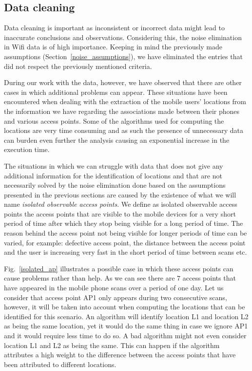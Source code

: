 \subsection{Data cleaning}
\label{data_cleaning}
Data cleaning is important as inconsistent or incorrect data might lead to
inaccurate conclusions and observations. Considering this, the noise elimination
in Wifi data is of high importance. Keeping in mind the previously made
assumptions (Section~\ref{noise_assumptions}), we have eliminated the entries
that did not respect the previously mentioned criteria. 

During our work  with the data, however, we have observed that there are
other cases in which additional problems can appear. These situations have
been encountered when dealing with the extraction of the mobile users' locations
from the information we have regarding the associations made between their
phones and various access points. Some of the algorithms used for computing the
locations are very time consuming and as such the presence of unnecessary data
can burden even further the analysis causing an exponential increase in the
execution time.

The situations in which we can struggle with data that does not give any
additional information for the identification of locations and that are not
necessarily solved by the noise elimination done based on the assumptions
presented in the previous sections are caused by the existence of what we will
name \textit{isolated observable access points}. We define as isolated
observable access points the access points that are visible to the mobile
devices for a very short period of time after which they stop being visible for
a long period of time. The reason behind the access point not being visible for
longer periods of time can be varied, for example: defective access point, the
distance between the access point and the user is increasing very fast in the
short period of time between scans etc. 

Fig.~\ref{isolated_ap} illustrates a possible case in which these access points
can cause problems rather than help. As we can see there are $7$ access points
that have appeared in the mobile phone scans over a period of one day. Let us
consider that access point AP1 only appears during two consecutive scans,
however, it will be taken into account when computing the locations that can be
identified for this scenario. An algorithm will identify location L1 and
location L2 as being the same location, yet it would do the same thing in case
we ignore AP1 and it would require less time to do so. A bad algorithm might not
even consider location L1 and L2 as being the same. This can happen if the
algorithm attributes a high weight to the difference between the access points
that have been attributed to different locations.

